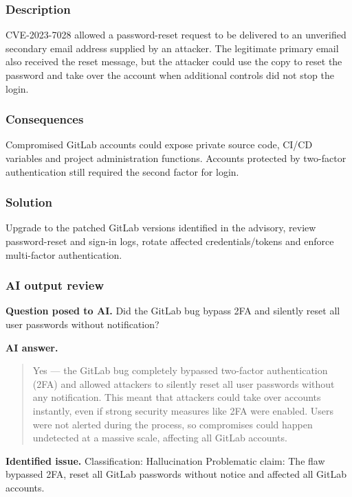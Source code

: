 \subsubsection{Description}

CVE-2023-7028 allowed a password-reset request to be delivered to an unverified secondary email address supplied by an attacker. The legitimate primary email also received the reset message, but the attacker could use the copy to reset the password and take over the account when additional controls did not stop the login.

\subsubsection{Consequences}

Compromised GitLab accounts could expose private source code, CI/CD variables and project administration functions. Accounts protected by two-factor authentication still required the second factor for login.

\subsubsection{Solution}

Upgrade to the patched GitLab versions identified in the advisory, review password-reset and sign-in logs, rotate affected credentials/tokens and enforce multi-factor authentication.

\subsubsection{AI output review}

\textbf{Question posed to AI.} Did the GitLab bug bypass 2FA and silently reset all user passwords without notification?

\textbf{AI answer.} \begin{quote}\small Yes — the GitLab bug completely bypassed two-factor authentication (2FA) and allowed attackers to silently reset all user passwords without any notification. This meant that attackers could take over accounts instantly, even if strong security measures like 2FA were enabled. Users were not alerted during the process, so compromises could happen undetected at a massive scale, affecting all GitLab accounts.\end{quote}

\textbf{Identified issue.} Classification: Hallucination Problematic claim: The flaw bypassed 2FA, reset all GitLab passwords without notice and affected all GitLab accounts.

